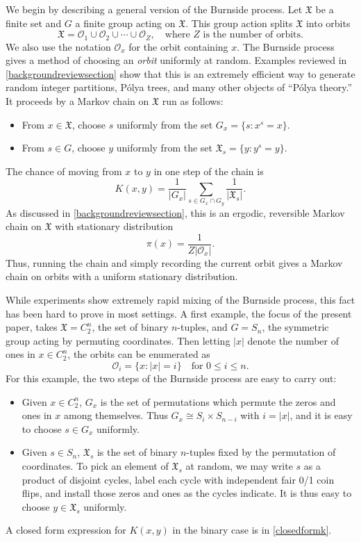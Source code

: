 \documentclass[11pt]{article}
\newcommand{\mf}{\mathfrak}
\newcommand{\mc}{\mathcal}
\newcounter{r}
\newcounter{s}
\numberwithin{equation}{section}
\begin{document}
We begin by describing a general version of the Burnside process. Let $\mf{X}$ be a finite set and $G$ a finite group acting on $\mf{X}$. This group action splits $\mf{X}$ into orbits
\[
    \mf{X} = \mc{O}_1 \cup \mc{O}_2 \cup \cdots \cup \mc{O}_Z, \quad \text{where }Z\text{ is the number of orbits.}
\]
We also use the notation $\mc{O}_x$ for the orbit containing $x$. The Burnside process gives a method of choosing an \textit{orbit} uniformly at random. Examples reviewed in \cref{backgroundreviewsection} show that this is an extremely efficient way to generate random integer partitions, P\'olya trees, and many other objects of ``P\'olya theory.'' It proceeds by a Markov chain on $\mf{X}$ run as follows:
\begin{itemize}
    \item From $x \in \mf{X}$, choose $s$ uniformly from the set $G_x = \{s: x^s = x\}$.
    \item From $s \in G$, choose $y$ uniformly from the set $\mf{X}_s = \{y: y^s = y\}$.
\end{itemize}
The chance of moving from $x$ to $y$ in one step of the chain is 
\begin{equation}\label{burnsidegenerictransition}
    K(x, y) = \frac{1}{|G_x|} \sum_{s \in G_x \cap G_y} \frac{1}{|\mf{X}_s|}.
\end{equation}
As discussed in \cref{backgroundreviewsection}, this is an ergodic, reversible Markov chain on $\mf{X}$ with stationary distribution
\[
    \pi(x) = \frac{1}{Z|\mc{O}_x|}.
\]
Thus, running the chain and simply recording the current orbit gives a Markov chain on orbits with a uniform stationary distribution. 

While experiments show extremely rapid mixing of the Burnside process, this fact has been hard to prove in most settings. A first example, the focus of the present paper, takes $\mf{X} = C_2^n$, the set of binary $n$-tuples, and $G = S_n$, the symmetric group acting by permuting coordinates. Then letting $|x|$ denote the number of ones in $x \in C_2^n$, the orbits can be enumerated as
\begin{equation}\label{binaryburnsideorbits}
    \mc{O}_i = \{x: |x| = i\} \quad \text{for }0 \le i \le n.
\end{equation}
For this example, the two steps of the Burnside process are easy to carry out:
\begin{itemize}
    \item Given $x \in C_2^n$, $G_x$ is the set of permutations which permute the zeros and ones in $x$ among themselves. Thus $G_x \cong S_i \times S_{n-i}$ with $i = |x|$, and it is easy to choose $s \in G_x$ uniformly.
    \item Given $s \in S_n$, $\mf{X}_s$ is the set of binary $n$-tuples fixed by the permutation of coordinates. To pick an element of $\mf{X}_s$ at random, we may write $s$ as a product of disjoint cycles, label each cycle with independent fair 0/1 coin flips, and install those zeros and ones as the cycles indicate. It is thus easy to choose $y \in \mf{X}_s$ uniformly.
\end{itemize}
A closed form expression for $K(x, y)$ in the binary case is in \cref{closedformk}. 
\end{document}
